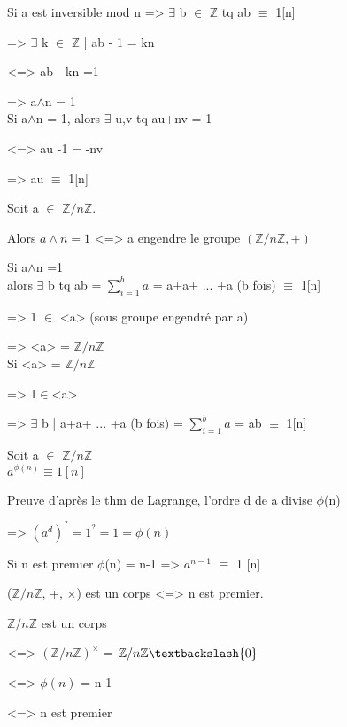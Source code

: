 \begin{dem}
	Si a est inversible mod n => $\exists$ b $\in$ $\mathbb{Z}$ tq ab $\equiv$ 1[n]
	
			=> $\exists$ k $\in$ $\mathbb{Z}$ | ab - 1 = kn
			
			<=> ab - kn =1
			
			=> a$\wedge$n = 1\\
	Si a$\wedge$n = 1, alors $\exists$ u,v tq au+nv = 1
	
	<=> au -1 = -nv
	
	=> au $\equiv$ 1[n]
\end{dem}
\begin{prop}
	Soit a $\in$ $\mathbb{Z}/n\mathbb{Z}$.
	
	Alors $a\wedge n = 1$ <=> a engendre le groupe $(\mathbb{Z}/n\mathbb{Z}, +)$
\end{prop}
\begin{dem}
	Si a$\wedge$n =1\\
	alors $\exists$ b tq ab = $\sum_{i=1}^{b} a$ = a+a+ ... +a (b fois) $\equiv$ 1[n]
	
	=> 1 $\in$ <a> (sous groupe engendré par a)
	
	=> <a> = $\mathbb{Z}/n\mathbb{Z}$\\
	Si <a> = $\mathbb{Z}/n\mathbb{Z}$
	
	=> 1$\in$<a>
	
	=> $\exists$ b | a+a+ ... +a (b fois) = $\sum_{i=1}^{b} a$ = ab $\equiv$ 1[n]
	
\end{dem}
\begin{cor}
	Soit a $\in$ $\mathbb{Z}/n\mathbb{Z}$\\
		$a^{\phi(n)} \equiv 1[n]$
\end{cor}
\begin{dem}
	Preuve d'après le thm de Lagrange, l'ordre d de a divise $\phi$(n) 
	
	=> $(a^{d})^{?} = 1^{?} = 1 = \phi(n)$
\end{dem}
\begin{rem}
	Si n est premier $\phi$(n) = n-1
	=> $a^{n-1}$ $\equiv$ 1 [n]
\end{rem}
\begin{cor}
	($\mathbb{Z}/n\mathbb{Z}$, +, $\times$) est un corps <=> n est premier.
\end{cor}
\begin{dem}
	$\mathbb{Z}/n\mathbb{Z}$ est un corps
	
	<=> $(\mathbb{Z}/n\mathbb{Z})^{\times}$ = $\mathbb{Z}/n\mathbb{Z}\textbackslash\{0\}$
	
	<=> $\phi(n)$ = n-1
	
	<=> n est premier
\end{dem}
